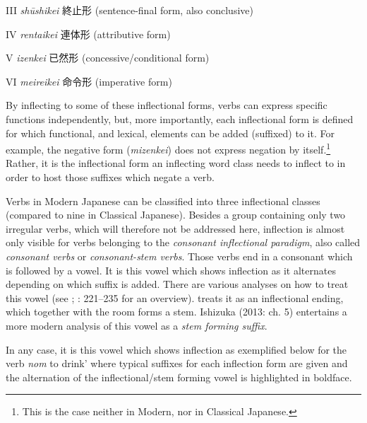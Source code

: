 \documentclass[output=paper]{langscibook}
\begin{document}
\begin{styleBeispielCinqueKapitel}
III \textit{shūshikei} 終止形 (sentence-final form, also conclusive)
\end{styleBeispielCinqueKapitel}

\begin{styleBeispielCinqueKapitel}
IV \textit{rentaikei} 連体形 (attributive form)
\end{styleBeispielCinqueKapitel}

\begin{styleBeispielCinqueKapitel}
V \textit{izenkei} 已然形 (concessive/conditional form)
\end{styleBeispielCinqueKapitel}

\begin{styleBeispielCinqueKapitel}
VI \textit{meireikei} 命令形 (imperative form)
\end{styleBeispielCinqueKapitel}

By inflecting to some of these inflectional forms, verbs can express specific functions independently, but, more importantly, each inflectional form is defined for which functional, and lexical, elements can be added (suffixed) to it. For example, the negative form (\textit{mizenkei}) does not express negation by itself.\footnote{This is the case neither in Modern, nor in Classical Japanese.} Rather, it is the inflectional form an inflecting word class needs to inflect to in order to host those suffixes which negate a verb.

Verbs in Modern Japanese can be classified into three inflectional classes (compared to nine in Classical Japanese). Besides a group containing only two irregular verbs, which will therefore not be addressed here, inflection is almost only visible for verbs belonging to the \textit{consonant inflectional paradigm}, also called \textit{consonant verbs} or \textit{consonant-stem verbs}. Those verbs end in a consonant which is followed by a vowel. It is this vowel which shows inflection as it alternates depending on which suffix is added. There are various analyses on how to treat this vowel (see \citealt{Kuno1973}; \citealt{Shibatani1990}: 221–235 for an overview). \citet[224]{Shibatani1990} treats it as an inflectional ending, which together with the room forms a stem. Ishizuka (2013: ch. 5) entertains a more modern analysis of this vowel as a \textit{stem forming suffix}.

 In any case, it is this vowel which shows inflection as exemplified below for the verb \textit{nom} {\textasciigrave}to drink' where typical suffixes for each inflection form are given and the alternation of the inflectional/stem forming vowel is highlighted in boldface.
\end{document}
